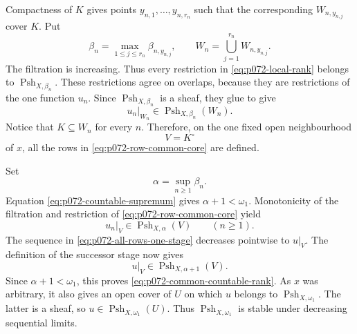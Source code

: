 Compactness of \(K\) gives points \(y_{n,1},\ldots,y_{n,r_n}\) such that
the corresponding \(W_{n,y_{n,j}}\) cover \(K\).  Put
\begin{equation}
 \label{eq:p072-row-rank}
       \beta_n=\max_{1\leq j\leq r_n}\beta_{n,y_{n,j}},
       \qquad
       W_n=\bigcup_{j=1}^{r_n}W_{n,y_{n,j}}.
\end{equation}
The filtration is increasing.  Thus every restriction in
\eqref{eq:p072-local-rank} belongs to
\(\operatorname{Psh}_{X,\beta_n}\).  These restrictions agree on overlaps,
because they are restrictions of the one function \(u_n\).  Since
\(\operatorname{Psh}_{X,\beta_n}\) is a sheaf, they glue to give
\begin{equation}
 \label{eq:p072-row-common-core}
              u_n|_{W_n}\in
              \operatorname{Psh}_{X,\beta_n}(W_n).
\end{equation}
Notice that \(K\subseteq W_n\) for every \(n\).  Therefore, on the one fixed
open neighbourhood
\begin{equation}
 \label{eq:p072-fixed-open-core}
                              V=K^\circ
\end{equation}
of \(x\), all the rows in \eqref{eq:p072-row-common-core} are defined.

Set
\begin{equation}
 \label{eq:p072-uniform-rank}
                         \alpha=\sup_{n\geq1}\beta_n.
\end{equation}
Equation \eqref{eq:p072-countable-supremum} gives
\(\alpha+1<\omega _1\).  Monotonicity of the filtration and restriction of
\eqref{eq:p072-row-common-core} yield
\begin{equation}
 \label{eq:p072-all-rows-one-stage}
       u_n|_V\in\operatorname{Psh}_{X,\alpha}(V)\qquad(n\geq1).
\end{equation}
The sequence in \eqref{eq:p072-all-rows-one-stage} decreases pointwise to
\(u|_V\).  The definition of the successor stage now gives
\begin{equation}
 \label{eq:p072-limit-next-stage}
              u|_V\in\operatorname{Psh}_{X,\alpha+1}(V).
\end{equation}
Since \(\alpha+1<\omega _1\), this proves
\eqref{eq:p072-common-countable-rank}.  As \(x\) was arbitrary, it also
gives an open cover of \(U\) on which \(u\) belongs to
\(\operatorname{Psh}_{X,\omega _1}\).  The latter is a sheaf, so
\(u\in\operatorname{Psh}_{X,\omega _1}(U)\).  Thus
\(\operatorname{Psh}_{X,\omega _1}\) is stable under decreasing sequential
limits.

